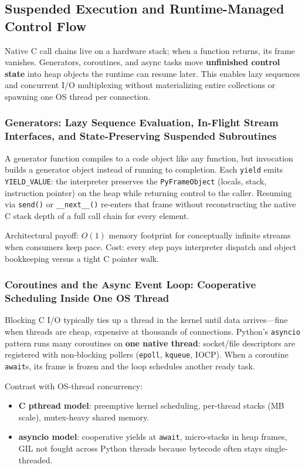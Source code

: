 \subsection{Suspended Execution and Runtime-Managed Control Flow}

Native C call chains live on a hardware stack; when a function returns, its frame vanishes. Generators, coroutines, and async tasks move \textbf{unfinished control state} into heap objects the runtime can resume later. This enables lazy sequences and concurrent I/O multiplexing without materializing entire collections or spawning one OS thread per connection.

\subsubsection{Generators: Lazy Sequence Evaluation, In-Flight Stream Interfaces, and State-Preserving Suspended Subroutines}

A generator function compiles to a code object like any function, but invocation builds a generator object instead of running to completion. Each \texttt{yield} emits \texttt{YIELD\_VALUE}: the interpreter preserves the \texttt{PyFrameObject} (locals, stack, instruction pointer) on the heap while returning control to the caller. Resuming via \texttt{send()} or \texttt{\_\_next\_\_()} re-enters that frame without reconstructing the native C stack depth of a full call chain for every element.

Architectural payoff: $O(1)$ memory footprint for conceptually infinite streams when consumers keep pace. Cost: every step pays interpreter dispatch and object bookkeeping versus a tight C pointer walk.

\subsubsection{Coroutines and the Async Event Loop: Cooperative Scheduling Inside One OS Thread}

Blocking C I/O typically ties up a thread in the kernel until data arrives---fine when threads are cheap, expensive at thousands of connections. Python's \texttt{asyncio} pattern runs many coroutines on \textbf{one native thread}: socket/file descriptors are registered with non-blocking pollers (\texttt{epoll}, \texttt{kqueue}, IOCP). When a coroutine \texttt{await}s, its frame is frozen and the loop schedules another ready task.

Contrast with OS-thread concurrency:
\begin{itemize}
    \item \textbf{C pthread model}: preemptive kernel scheduling, per-thread stacks (MB scale), mutex-heavy shared memory.
    \item \textbf{asyncio model}: cooperative yields at \texttt{await}, micro-stacks in heap frames, GIL not fought across Python threads because bytecode often stays single-threaded.
\end{itemize}

